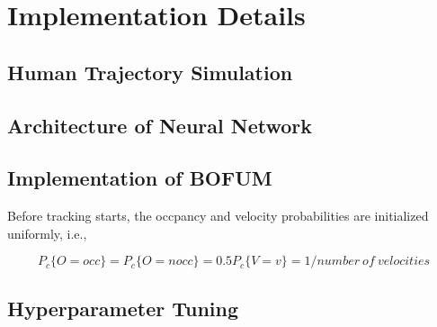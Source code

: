\chapter{Implementation Details} \label{chapter:4}

\section{Human Trajectory Simulation}

\section{Architecture of Neural Network}

\section{Implementation of BOFUM}

Before tracking starts, the occpancy and velocity probabilities are initialized uniformly, i.e.,

\[ P_c\{ O = occ \}=P_c\{O = nocc\}=0.5  P_c\{V= v \}=1/number \ of \ velocities \] 

\section{Hyperparameter Tuning}


